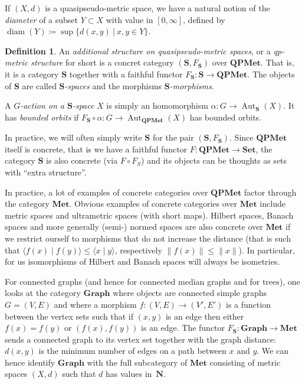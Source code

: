 \documentclass[a4paper]{article}
\theoremstyle{definition}
\newtheorem{defn}[lem]{Definition}
\DeclareMathOperator\Aut{Aut}
\DeclareMathOperator\diam{diam}
\newcommand*{\field}[1]{\mathbf{#1}}
\newcommand*{\N}{\field{N}}
\newcommand{\setst}[2]{\{#1\ |\ #2\}}
\begin{document}
If $(X,d)$ is a quasipseudo-metric space, we have a natural notion of the  \emph{diameter} of a subset $Y\subset X$ with value in $[0,\infty]$, defined by $\diam(Y)\coloneqq\sup\setst{d(x,y)}{x,y\in Y}$.
%
%
\begin{defn}\label{Def:Categoric}
An \emph{additional structure on quasipseudo-metric spaces}, or a \emph{qp-metric structure} for short is a concret category $(\mathbf S,F_{\mathbf S})$ over $\mathbf{QPMet}$.
That is, it is a category $\mathbf{S}$ together with a faithful functor $F_{\mathbf S}\colon \mathbf{S}\to \mathbf{QPMet}$.
The objects of $\mathbf{S}$ are called \emph{$\mathbf S$-spaces} and the morphisms \emph{$\mathbf S$-morphisms}.

A \emph{$G$-action on a $\mathbf S$-space} $X$ is simply an homomorphism $\alpha\colon G\to\Aut_{\mathbf{S}}(X)$. It has \emph{bounded orbits} if $F_{\mathbf S}\circ \alpha\colon G\to \Aut_{\mathbf{QPMet}}(X)$ has bounded orbits.
\end{defn}
%
%
In practice, we will often simply write $\mathbf{S}$  for the pair $(\mathbf{S},F_{\mathbf{S}})$.
Since $\mathbf{QPMet}$ itself is concrete, that is we have a faithful functor $F\colon \mathbf{QPMet}\to\mathbf{Set}$, the category $\mathbf{S}$ is also concrete (via $F\circ F_S$) and its objects can be thoughts as sets with ``extra structure''.

In practice, a lot of examples of concrete categories over $\mathbf{QPMet}$ factor through the category $\mathbf{Met}$.
Obvious examples of concrete categories over $\mathbf{Met}$ include metric spaces and ultrametric spaces (with short maps).
Hilbert spaces, Banach spaces and more generally (semi-) normed spaces are also concrete over $\mathbf{Met}$ if we restrict ourself to morphisms that do not increase the distance (that is such that $\langle f(x)\mid f(y)\rangle\leq\langle x\mid y\rangle$, respectively $\|f(x)\|\leq\| x\|$). In particular, for us isomorphisms of Hilbert and Banach spaces will always be isometries.
 
For connected graphs (and hence for connected median graphs and for trees), one looks at the category $\mathbf{Graph}$ where objects are connected simple graphs $G=(V,E)$ and where a morphism $f\colon (V,E)\to(V',E')$ is a function between the vertex sets such that if $(x,y)$ is an edge then either $f(x)=f(y)$ or $(f(x),f(y))$ is an edge.
The functor $F_{\mathbf S}\colon\mathbf{Graph}\to\mathbf{Met}$ sends a connected graph to its vertex set together with the graph distance: $d(x,y)$ is the minimum number of edges on a path between $x$ and $y$.
We can hence identify $\mathbf{Graph}$ with the full subcategory of $\mathbf{Met}$ consisting of metric spaces $(X,d)$ such that $d$ has values in~$\N$.
\end{document}
